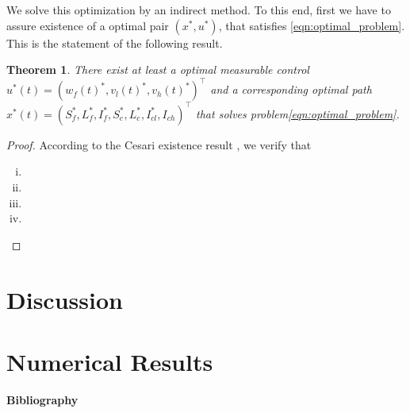 \documentclass[preprint, 12pt]{elsarticle}
\newtheorem{theorem}{Theorem}
\begin{document}
        We solve this optimization by an indirect method. To this end, first we
    have to assure existence of a optimal pair $(x^*, u^*)$,
    that satisfies \cref{eqn:optimal_problem}. This is the statement of
    the following result.

    \begin{theorem}
        There exist at least a optimal measurable control
        $
            u ^ * (t ) =(w_f(t) ^ *, v_l(t) ^ *, v_h(t) ^ * ) ^{\top}
        $ and a
        corresponding
        optimal path
        $
            x ^ *(t) =(
                S_f ^ *,
                L_f ^ *,
                I_f ^ *,
                S_c ^ *,
                L_c ^ *,
                I_{cl} ^ *,
                I_{ch}
            ) ^ {\top}
        $
        that solves problem\eqref{eqn:optimal_problem}.
    \end{theorem}
   \begin{proof}
        According to the Cesari existence result
        \cite[][p. 69]{fleming2012}, we verify that
        \begin{enumerate}[(i)]
            \item
            \item
            \item
            \item
        \end{enumerate}
   \end{proof}

\section{Discussion}

\section{Numerical Results}

    

\textbf{Bibliography}


\end{document}
